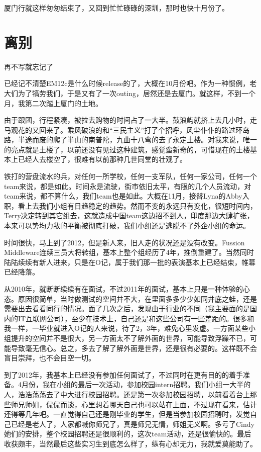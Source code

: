 厦门行就这样匆匆结束了，又回到忙忙碌碌的深圳，那时也快十月份了。


\newpage
\section*{离别}

再不写就忘记了

已经记不清楚EM12c是什么时候release的了，大概在10月份吧。作为一种惯例，老大们为了犒劳我们，于是又有了一次outing，居然还是去厦门。就这样，不到一个月，我第二次踏上厦门的土地。

由于跟团，行程紧凑，被拉去购物的时间占了一大半。鼓浪屿就挤上去几小时，走马观花的又回来了。乘风破浪的和“三民主义”打了个招呼，风尘仆仆的路过环岛路，半途而废的爬了半山的南普陀，九曲十八弯的去了永定土楼。对我来说，唯一的亮点就是土楼了，以前还没有见过这种建筑，感觉蛮新奇的，可惜现在的土楼基本上已经人去楼空了，很难有以前那种几世同堂的壮观了。

铁打的营盘流水的兵，对任何一所学校，任何一支军队，任何一家公司，任何一个team来说，都是如此。时间永是流驶，街市依旧太平，有限的几个人员流动，对team来说，都不算什么，我们team也是如此。大概在11月，接替Lyna的Abby入职，看上去我们小组有日趋稳定的趋势。然而不变的永远只有变化，很短时间内，Terry决定转到其它组去，这就造成中国team这边招不到人，印度那边大肆扩张，本来可以势均力敌的平衡被彻底打破，我们小组还是逃脱不了外企小组的命运。

时间很快，马上到了2012，但是新人来，旧人走的状况还是没有改变。Fussion Middleware连续三员大将转组，基本上整个组经历了4年，推倒重建了。当然同时陆陆续续有新人进来，只是在O记，属于我们那一批的表演基本上已经结束，帷幕已经降落。

从2010年，就断断续续有在面试，不过2011年的面试，基本上只是一种体验的心态。原因很简单，当时做测试的空间并不大，在里面多多少少如同井底之蛙，还是需要出去看看同行的情况。面了几次之后，发现由于行业的不同（我主要面的是国内的IT互联网公司），至少在技术上，自己还是和这些公司有一些差距的。很多和我一样，一毕业就进入O记的人来说，待了2，3年，难免心里发虚。一方面某些小组提升的空间并不是很大，另一方面太不了解外面的世界，可能导致浮躁不已，可能导致毫无信心。总之，多去了解了解外面是世界，还是很有必要的。这样既不会盲目崇拜，也不会目空一切。

到了2012年，我基本上已经没有参加任何面试了，不过同时在更有目的的着手准备。4月份，我在小组的最后一次活动，参加校园intern招聘。我们小组一大半的人，浩浩荡荡去了中大进行校园招聘。还是第一次参加校园招聘，以前看着台上那些师兄师姐，侃侃而谈，心里想着哪天自己也可以站在上面，不过现在看来，估计还得等几年吧。一直觉得自己还是刚毕业的学生，但是当参加校园招聘时，发觉自己已经是老人了，人家都喊你师兄了，真是师兄无情，师姐无义啊。多亏了Cindy她们的安排，整个校园招聘还是很顺利的，这次team活动，还是很愉快的。最后收获颇丰，当然最后这些实习生到底怎么样了，纵有心却无力，我就爱莫能助了。


